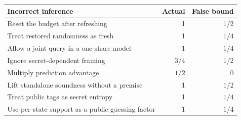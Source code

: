 \begin{tabular}{p{9.5cm}rr}
\toprule
Incorrect inference & Actual & False bound \\
\midrule
Reset the budget after refreshing & 1 & $1/2$ \\
Treat restored randomness as fresh & 1 & $1/4$ \\
Allow a joint query in a one-share model & 1 & $1/4$ \\
Ignore secret-dependent framing & $3/4$ & $1/2$ \\
Multiply prediction advantage & $1/2$ & 0 \\
Lift standalone soundness without a premise & 1 & $1/2$ \\
Treat public tags as secret entropy & 1 & $1/4$ \\
Use per-state support as a public guessing factor & 1 & $1/4$ \\
\bottomrule
\end{tabular}
